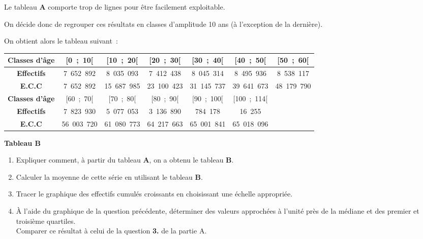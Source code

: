\par
Le tableau \textbf{A} comporte trop de lignes pour être facilement exploitable.
\par
On décide donc de regrouper ces résultats en classes d'amplitude 10 ans (à l'exception de la dernière).
\par
On obtient alors le tableau suivant~:
\begin{center}
     \begin{tabular}{|c|c|c|c|c|c|c|}\hline %
          \textbf{Classes d'âge }& [0~;~10[ & [10~;~20[ & [20~;~30[ & [30~;~40[ & [40~;~50[ & [50~;~60[\\ \hline
          \textbf{Effectifs} & 7~652~892  &  8~035~093  &  7~412~438  &  8~045~314  &  8~495~936 &  8~538~117   \\ \hline
          \textbf{E.C.C} & 7~652~892  &  15~687~985  &  23~100~423  &  31~145~737  &  39~641~673  &  48~179~790  \\ \hline
          \textbf{Classes d'âge} &[60~;~70[ & [70~;~80[ & [80~;~90[ & [90~;~100[ & [100~;~114[ \\ \hline
          \textbf{Effectifs} & 7~823~930  &  5~077~053  &  3~136~890  &  784~178  &  16~255 \\ \hline
          \textbf{E.C.C} & 56~003~720  &  61~080~773  &  64~217~663  &  65~001~841  &  65~018~096 \\ \hline
     \end{tabular}
     \textbf{Tableau B}
\end{center}
\bigskip
\begin{enumerate}
     \item %
     Expliquer comment, à partir du tableau \textbf{A}, on a obtenu le tableau \textbf{B}.
     \item %
     Calculer la moyenne de cette série en utilisant le tableau \textbf{B}.
     \item %
     Tracer le graphique des effectifs cumulés croissants en choisissant une échelle appropriée.
     \item %
     \`A l'aide du graphique de la question précédente, déterminer des valeurs approchées à l'unité près de la médiane et des premier et troisième quartiles.\\
     Comparer ce résultat à celui de la question \textbf{3.} de la partie A.
\end{enumerate}
